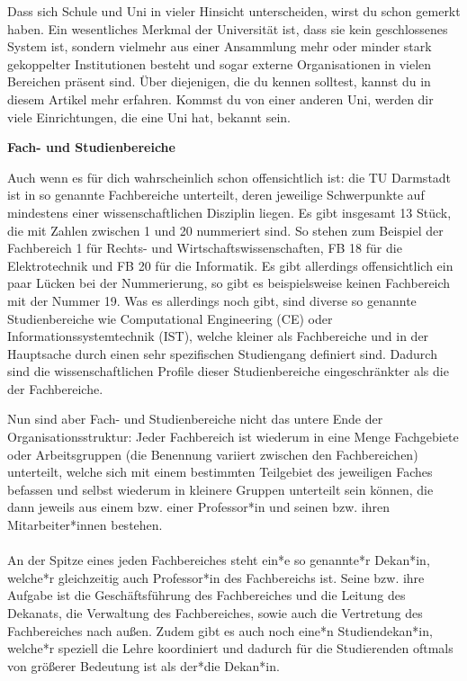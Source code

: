 {Dass sich Schule und Uni in vieler Hinsicht unterscheiden, wirst du schon gemerkt haben. Ein wesentliches Merkmal der Universität ist, dass sie kein geschlossenes System ist, sondern vielmehr aus einer Ansammlung mehr oder minder stark gekoppelter Institutionen besteht und sogar externe Organisationen in vielen Bereichen präsent sind. Über diejenigen, die du kennen solltest, kannst du in diesem Artikel mehr erfahren. Kommst du von einer anderen Uni, werden dir viele Einrichtungen, die eine Uni hat, bekannt sein.
}{\textbf{Fach- und Studienbereiche}

    Auch wenn es für dich wahrscheinlich schon offensichtlich ist: die TU Darmstadt ist in so genannte Fachbereiche unterteilt, deren jeweilige Schwerpunkte auf mindestens einer wissenschaftlichen Disziplin liegen. Es gibt insgesamt 13 Stück, die mit Zahlen zwischen 1 und 20 nummeriert sind. So stehen zum Beispiel der Fachbereich 1 für Rechts- und Wirtschaftswissenschaften, FB 18 für die Elektrotechnik und FB 20 für die Informatik. Es gibt allerdings offensichtlich ein paar Lücken bei der Nummerierung, so gibt es beispielsweise keinen Fachbereich mit der Nummer 19. Was es allerdings noch gibt, sind diverse so genannte Studienbereiche wie Computational Engineering (CE) oder Informationssystemtechnik (IST), welche kleiner als Fachbereiche und in der Hauptsache durch einen sehr spezifischen Studiengang definiert sind. Dadurch sind die wissenschaftlichen Profile dieser Studienbereiche eingeschränkter als die der Fachbereiche.

    Nun sind aber Fach- und Studienbereiche nicht das untere Ende der Organisationsstruktur: Jeder Fachbereich ist wiederum in eine Menge Fachgebiete oder Arbeitsgruppen (die Benennung variiert zwischen den Fachbereichen) unterteilt, welche sich mit einem bestimmten Teilgebiet des jeweiligen Faches befassen und selbst wiederum in kleinere Gruppen unterteilt sein können, die dann jeweils aus einem bzw. einer Professor*in und seinen bzw. ihren Mitarbeiter*innen bestehen.
    \\\\
    An der Spitze eines jeden Fachbereiches steht ein*e so genannte*r Dekan*in, welche*r gleichzeitig auch Professor*in des Fachbereichs ist. Seine bzw. ihre Aufgabe ist die Geschäftsführung des Fachbereiches und die Leitung des Dekanats, die Verwaltung des Fachbereiches, sowie auch die Vertretung des Fachbereiches nach außen. Zudem gibt es auch noch eine*n Studiendekan*in, welche*r speziell die Lehre koordiniert und dadurch für die Studierenden oftmals von größerer Bedeutung ist als der*die Dekan*in.\\

}
